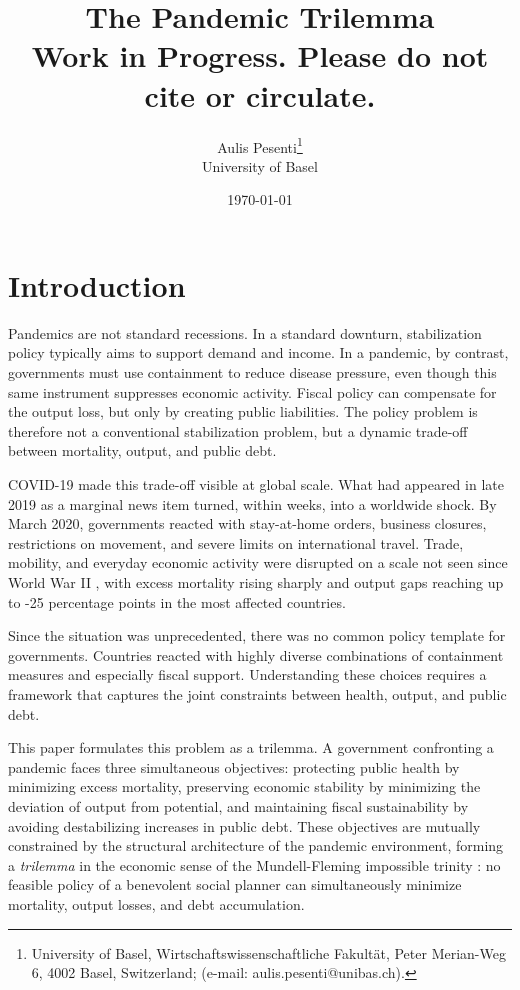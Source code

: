 \documentclass[12pt, a4paper]{article}
\title{\textbf{The Pandemic Trilemma} \\[1em] 
\large Work in Progress. Please do not cite or circulate.}
\author{Aulis Pesenti\setcounter{footnote}{1}\thanks{University of Basel, Wirtschaftswissenschaftliche Fakultät, Peter Merian-Weg 6, 4002 Basel, Switzerland; (e-mail: aulis.pesenti@unibas.ch).} \\ University of Basel}
\date{\today}
\begin{document}
\maketitle

\begin{abstract}

\end{abstract}

\newpage

\section{Introduction}

Pandemics are not standard recessions. In a standard downturn, stabilization policy typically aims to support demand and income. In a pandemic, by contrast, governments must use containment to reduce disease pressure, even though this same instrument suppresses economic activity. Fiscal policy can compensate for the output loss, but only by creating public liabilities. The policy problem is therefore not a conventional stabilization problem, but a dynamic trade-off between mortality, output, and public debt. 

COVID-19 made this trade-off visible at global scale. What had appeared in late 2019 as a marginal news item turned, within weeks, into a worldwide shock. By March 2020, governments reacted with stay-at-home orders, business closures, restrictions on movement, and severe limits on international travel. Trade, mobility, and everyday economic activity were disrupted on a scale not seen since World War II \citep{OECD2020EconomicOutlook, WorldBank2020GEP}, with excess mortality rising sharply and output gaps reaching up to -25 percentage points in the most affected countries.

Since the situation was unprecedented, there was no common policy template for governments. Countries reacted with highly diverse combinations of containment measures and especially fiscal support. Understanding these choices requires a framework that captures the joint constraints between health, output, and public debt.

This paper formulates this problem as a trilemma. A government confronting a pandemic faces three simultaneous objectives: protecting public health by minimizing excess mortality, preserving economic stability by minimizing the deviation of output from potential, and maintaining fiscal sustainability by avoiding destabilizing increases in public debt. These objectives are mutually constrained by the structural architecture of the pandemic environment, forming a \textit{trilemma} in the economic sense of the Mundell-Fleming impossible trinity \citep{mundell1963}: no feasible policy of a benevolent social planner can simultaneously minimize mortality, output losses, and debt accumulation.
\end{document}
